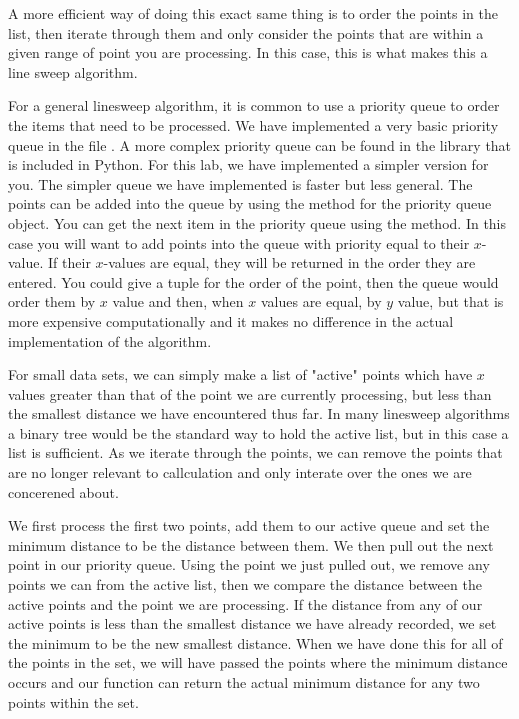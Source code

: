 A more efficient way of doing this exact same thing is to order the points in the list, then iterate through them and only consider the points that are within a given range of point you are processing. 
In this case, this is what makes this a line sweep algorithm. 

For a general linesweep algorithm, it is common to use a priority queue to order the items that need to be processed.
We have implemented a very basic priority queue in the file . 
A more complex priority queue can be found in the library  that is included in Python. 
For this lab, we have implemented a simpler version for you. 
The simpler queue we have implemented is faster but less general. 
The points can be added into the queue by using the  method for the priority queue object. 
You can get the next item in the priority queue using the  method. 
In this case you will want to add points into the queue with priority equal to their $x$-value. 
If their $x$-values are equal, they will be returned in the order they are entered. 
You could give a tuple for the order of the point, then the queue would order them by $x$ value and then, when $x$ values are equal, by $y$ value, but that is more expensive computationally and it makes no difference in the actual implementation of the algorithm. 

For small data sets, we can simply make a list of "active" points which have $x$ values greater than that of the point we are currently processing, but less than the smallest distance we have encountered thus far. 
In many linesweep algorithms a binary tree would be the standard way to hold the active list, but in this case a list is sufficient.
As we iterate through the points, we can remove the points that are no longer relevant to callculation and only interate over the ones we are concerened about.

We first process the first two points, add them to our active queue and set the minimum distance to be the distance between them. 
We then pull out the next point in our priority queue. 
Using the point we just pulled out, we remove any points we can from the active list, then we compare the distance between the active points and the point we are processing. 
If the distance from any of our active points is less than the smallest distance we have already recorded, we set the minimum to be the new smallest distance. 
When we have done this for all of the points in the set, we will have passed the points where the minimum distance occurs and our function can return the actual minimum distance for any two points within the set.

